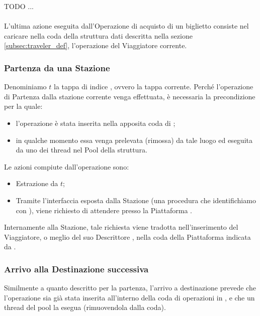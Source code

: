 	TODO
	...
	\\
	\\
	
	L'ultima azione eseguita dall'Operazione di acquisto di un biglietto consiste nel caricare nella coda della struttura dati  descritta nella sezione \ref{subsec:traveler_def}, l'operazione  del Viaggiatore corrente.
	
	\subsubsection{Partenza da una Stazione}
	
	Denominiamo $t$ la tappa di indice , ovvero la tappa corrente. Perché l'operazione di Partenza dalla stazione corrente venga effettuata, è necessaria la precondizione per la quale:
	\begin{itemize}
		\item l'operazione  è stata inserita nella apposita coda di ;
		\item in qualche momento essa venga prelevata (rimossa) da tale luogo ed eseguita da uno dei thread nel Pool della struttura. 
	\end{itemize}
Le azioni compiute dall'operazione  sono:
	
	\begin{itemize}
		\item Estrazione  da $t$;
		\item Tramite l'interfaccia esposta dalla Stazione  (una procedura che identifichiamo con ), viene richiesto di attendere presso la Piattaforma .
	\end{itemize} 
	
	Internamente alla Stazione, tale richiesta viene tradotta nell'inserimento del Viaggiatore, o meglio del suo Descrittore , nella coda  della Piattaforma indicata da .
	
	\subsubsection{Arrivo alla Destinazione successiva}
		
	Similmente a quanto descritto per la partenza, l'arrivo a destinazione prevede che l'operazione  sia già stata inserita all'interno della coda di operazioni in , e che un thread del pool la esegua (rimuovendola dalla coda).
	

